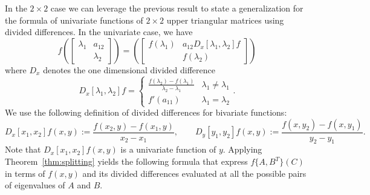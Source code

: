 \documentclass{siamart1116}
\begin{document}
In the $2\times 2$ case we can leverage the previous 
result to state a generalization for the formula of 
univariate functions of $2 \times 2$ upper triangular 
matrices using divided differences. In the univariate
case, we have
\cite[Theorem 4.11]{higham2008functions}
\[
f\left(\begin{bmatrix}
\lambda_1& a_{12}\\
&\lambda_2
\end{bmatrix}\right)=\left(\begin{bmatrix}
f(\lambda_1)& a_{12}D_x[\lambda_1, \lambda_2]f\\
&f(\lambda_2)
\end{bmatrix}\right)\]
where $D_x$ denotes the one dimensional divided difference 
\[D_x[\lambda_1, \lambda_2]f=\begin{cases}
\frac{f(\lambda_2)-f(\lambda_1)}{\lambda_2-\lambda_1}&\lambda_1\neq \lambda_1\\
f'(a_{11})&\lambda_1=\lambda_2
\end{cases}.
\]
We use the following definition of divided differences for bivariate functions:
\[
D_x[x_1,x_2]f(x,y):=\frac{f(x_2, y)-f(x_1,y)}{x_2-x_1},\qquad D_y[y_1,y_2]f(x,y):=\frac{f(x,y_2)-f(x, y_1)}{y_2-y_1}.
\]
Note that $D_x[x_1,x_2]f(x,y)$ is a univariate function of $y$.
Applying Theorem~\ref{thm:splitting}  yields the following formula that express $f\{A,B^T\}(C)$ in terms of $f(x,y)$ and its divided differences evaluated at all the possible  pairs of eigenvalues of $A$ and $B$.
\end{document}
